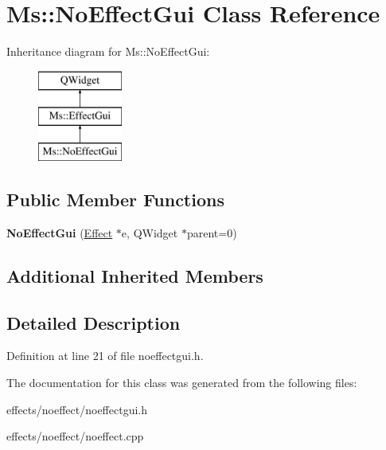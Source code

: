 \hypertarget{class_ms_1_1_no_effect_gui}{}\section{Ms\+:\+:No\+Effect\+Gui Class Reference}
\label{class_ms_1_1_no_effect_gui}
Inheritance diagram for Ms\+:\+:No\+Effect\+Gui\+:\begin{figure}[H]
\begin{center}
\leavevmode
\includegraphics[height=3.000000cm]{class_ms_1_1_no_effect_gui}
\end{center}
\end{figure}
\subsection*{Public Member Functions}
\begin{DoxyCompactItemize}
\item 
\mbox{\label{class_ms_1_1_no_effect_gui_a6ff5d38cdd51d65a2f00f8e607435bd9}} 
{\bfseries No\+Effect\+Gui} (\hyperlink{class_ms_1_1_effect}{Effect} $\ast$e, Q\+Widget $\ast$parent=0)
\end{DoxyCompactItemize}
\subsection*{Additional Inherited Members}


\subsection{Detailed Description}


Definition at line 21 of file noeffectgui.\+h.



The documentation for this class was generated from the following files\+:\begin{DoxyCompactItemize}
\item 
effects/noeffect/noeffectgui.\+h\item 
effects/noeffect/noeffect.\+cpp\end{DoxyCompactItemize}
